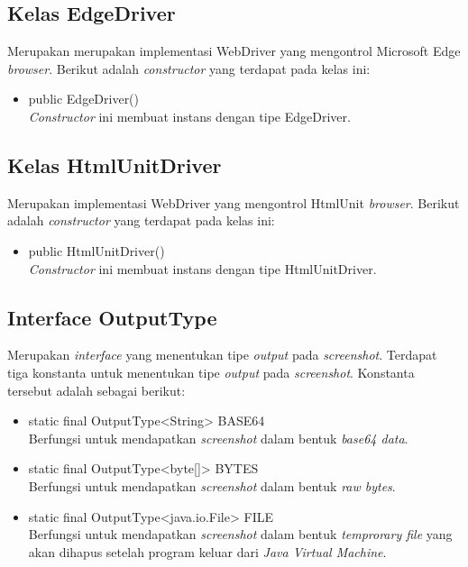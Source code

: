 \subsection{Kelas EdgeDriver}
\label{subsec:edgedriver}
Merupakan merupakan implementasi WebDriver yang mengontrol Microsoft Edge \textit{browser}. Berikut adalah \textit{constructor} yang terdapat pada kelas ini:
\begin{itemize}
\item public EdgeDriver()\\
\textit{Constructor} ini membuat instans dengan tipe EdgeDriver.
\end{itemize}


\subsection{Kelas HtmlUnitDriver}
\label{subsec:htmlunitdriver}
Merupakan implementasi WebDriver yang mengontrol HtmlUnit \textit{browser}. Berikut adalah \textit{constructor} yang terdapat pada kelas ini:
\begin{itemize}
\item public HtmlUnitDriver()\\
\textit{Constructor} ini membuat instans dengan tipe HtmlUnitDriver.
\end{itemize}


\subsection{Interface OutputType}
\label{subsec:output_type}
Merupakan \textit{interface} yang menentukan tipe \textit{output} pada \textit{screenshot}. Terdapat tiga konstanta untuk menentukan tipe \textit{output} pada \textit{screenshot}. Konstanta tersebut adalah sebagai berikut:
\begin{itemize}
\item static final OutputType<String> BASE64\\
Berfungsi untuk mendapatkan \textit{screenshot} dalam bentuk \textit{base64 data}.
\item static final OutputType<byte[]> BYTES\\
Berfungsi untuk mendapatkan \textit{screenshot} dalam bentuk \textit{raw bytes}.
\item static final OutputType<java.io.File> FILE\\
Berfungsi untuk mendapatkan \textit{screenshot} dalam bentuk \textit{temprorary file} yang akan dihapus setelah program keluar dari \textit{Java Virtual Machine}.
\end{itemize}

